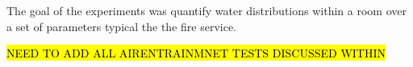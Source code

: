 \documentclass[12pt,oneside]{book}
\begin{document}
The goal of the experiments was quantify water distributions within a room over a set of parameters typical the the fire service. 




\clearpage

\appendix

\hl{NEED TO ADD ALL AIRENTRAINMNET TESTS DISCUSSED WITHIN}




\end{document}
